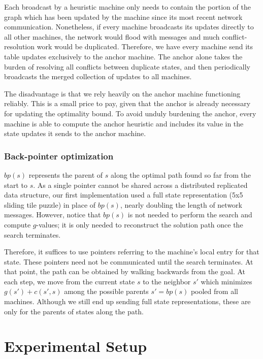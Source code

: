 \documentclass{article}
\begin{document}
Each broadcast by a heuristic machine only needs to contain the portion of the graph which has been updated by the machine since its most recent network communication. Nonetheless, if every machine broadcasts its updates directly to all other machines, the network would flood with messages and much conflict-resolution work would be duplicated. Therefore, we have every machine send its table updates exclusively to the anchor machine. The anchor alone takes the burden of resolving all conflicts between duplicate states, and then periodically broadcasts the merged collection of updates to all machines.

The disadvantage is that we rely heavily on the anchor machine functioning reliably. This is a small price to pay, given that the anchor is already necessary for updating the optimality bound. To avoid unduly burdening the anchor, every machine is able to compute the anchor heuristic and includes its value in the state updates it sends to the anchor machine.

\subsubsection*{Back-pointer optimization}

$bp(s)$ represents the parent of $s$ along the optimal path found so far from the start to $s$. As a single pointer cannot be shared across a distributed replicated data structure, our first implementation used a full state representation (5x5 sliding tile puzzle) in place of $bp(s)$, nearly doubling the length of network messages. However, notice that $bp(s)$ is not needed to perform the search and compute $g$-values; it is only needed to reconstruct the solution path once the search terminates.

Therefore, it suffices to use pointers referring to the machine's local entry for that state. These pointers need not be communicated until the search terminates. At that point, the path can be obtained by walking backwards from the goal. At each step, we move from the current state $s$ to the neighbor $s'$ which minimizes $g(s') + c(s',s)$ among the possible parents $s'=bp(s)$ pooled from all machines. Although we still end up sending full state representations, these are only for the parents of states along the path.


\section{Experimental Setup}
\end{document}

